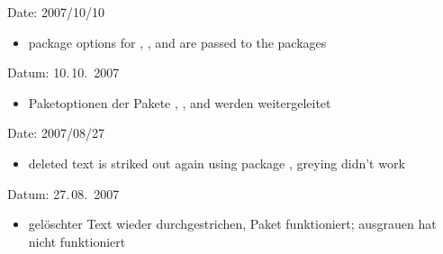 
\ifENGLISH
	Date: 2007/10/10
	\begin{itemize}
	\item package options for , , and  are passed to the packages
	\end{itemize}
\fi
	\ifGERMAN
		Datum: 10.\,10.~2007
		\begin{itemize}
		\item Paketoptionen der Pakete , , and  werden weitergeleitet
		\end{itemize}
	\fi


\ifENGLISH
	Date: 2007/08/27
	\begin{itemize}
	\item deleted text is striked out again using package , greying didn't work
	\end{itemize}
\fi
	\ifGERMAN
		Datum: 27.\,08.~2007
		\begin{itemize}
		\item gelöschter Text wieder durchgestrichen, Paket  funktioniert; ausgrauen hat nicht funktioniert
		\end{itemize}
	\fi


